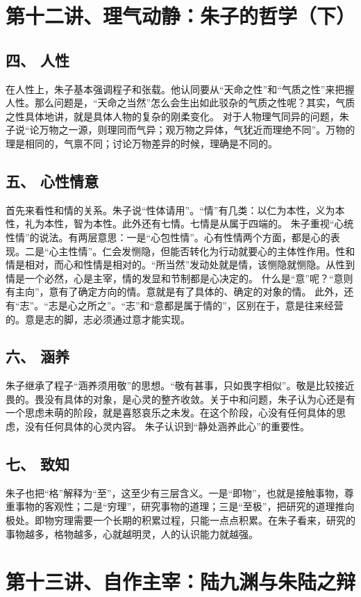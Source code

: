 \documentclass{article}
\begin{document}
\section{第十二讲、理气动静：朱子的哲学（下）}
\subsection{四、	人性}
在人性上，朱子基本强调程子和张载。他认同要从“天命之性”和“气质之性”来把握人性。那么问题是，“天命之当然”怎么会生出如此驳杂的气质之性呢？其实，气质之性具体地讲，就是具体人物的复杂的刚柔变化。
对于人物理气同异的问题，朱子说“论万物之一源，则理同而气异；观万物之异体，气犹近而理绝不同”。万物的理是相同的，气禀不同；讨论万物差异的时候，理确是不同的。
\subsection{五、	心性情意}
首先来看性和情的关系。朱子说“性体请用”。“情”有几类：以仁为本性，义为本性，礼为本性，智为本性。此外还有七情。七情是从属于四端的。
朱子重视“心统性情”的说法。有两层意思：一是“心包性情”。心有性情两个方面，都是心的表现。二是“心主性情”。仁会发恻隐，但能否转化为行动就要心的主体性作用。性和情是相对，而心和性情是相对的。“所当然”发动处就是情，该恻隐就恻隐。从性到情是一个必然，心是主宰，情的发显和节制都是心决定的。
什么是“意”呢？“意则有主向”，意有了确定方向的情。意就是有了具体的、确定的对象的情。
此外，还有“志”。“志是心之所之”。“志”和“意都是属于情的”，区别在于，意是往来经营的。意是志的脚，志必须通过意才能实现。
\subsection{六、	涵养}
朱子继承了程子“涵养须用敬”的思想。“敬有甚事，只如畏字相似”。敬是比较接近畏的。畏没有具体的对象，是心灵的整齐收敛。关于中和问题，朱子认为心还是有一个思虑未萌的阶段，就是喜怒哀乐之未发。在这个阶段，心没有任何具体的思虑，没有任何具体的心灵内容。
朱子认识到“静处涵养此心”的重要性。
\subsection{七、	致知}
朱子也把“格”解释为“至”，这至少有三层含义。一是“即物”，也就是接触事物，尊重事物的客观性；二是“穷理”，研究事物的道理；三是“至极”，把研究的道理推向极处。即物穷理需要一个长期的积累过程，只能一点点积累。在朱子看来，研究的事物越多，格物越多，心就越明灵，人的认识能力就越强。

\section{第十三讲、自作主宰：陆九渊与朱陆之辩}
\end{document}
